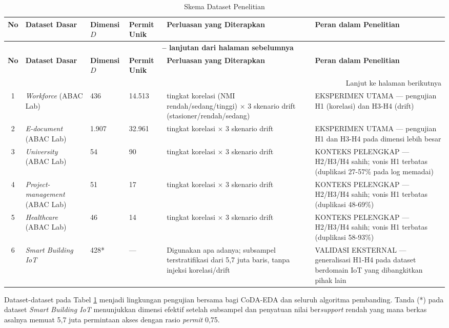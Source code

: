 \begin{longtable}{|c|>{\raggedright\arraybackslash}p{2.2cm}|p{1.5cm}|p{1.5cm}|>{\raggedright\arraybackslash}p{3cm}|>{\raggedright\arraybackslash}p{3cm}|}
\caption{Skema Dataset Penelitian}
\label{tab:skema-dataset} \\
\hline
\textbf{No} & \textbf{Dataset Dasar} & \textbf{Dimensi $D$} & \textbf{Permit Unik} & \textbf{Perluasan yang Diterapkan} & \textbf{Peran dalam Penelitian} \\
\hline
\endfirsthead

\multicolumn{6}{c}{{\bfseries \tablename\ \thetable{} -- lanjutan dari halaman sebelumnya}} \\
\hline
\textbf{No} & \textbf{Dataset Dasar} & \textbf{Dimensi $D$} & \textbf{Permit Unik} & \textbf{Perluasan yang Diterapkan} & \textbf{Peran dalam Penelitian} \\
\hline
\endhead

\hline
\multicolumn{6}{r}{Lanjut ke halaman berikutnya} \\
\endfoot

\hline
\endlastfoot

1 & \textit{Workforce} (ABAC Lab) & 436 & 14.513 & 3 tingkat korelasi (NMI rendah/sedang/tinggi) $\times$ 3 skenario drift (stasioner/rendah/sedang) & EKSPERIMEN UTAMA --- pengujian H1 (korelasi) dan H3-H4 (drift) \\
\hline
2 & \textit{E-document} (ABAC Lab) & 1.907 & 32.961 & 3 tingkat korelasi $\times$ 3 skenario drift & EKSPERIMEN UTAMA --- pengujian H1 dan H3-H4 pada dimensi lebih besar \\
\hline
3 & \textit{University} (ABAC Lab) & 54 & 90 & 3 tingkat korelasi $\times$ 3 skenario drift & KONTEKS PELENGKAP --- H2/H3/H4 sahih; vonis H1 terbatas (duplikasi 27-57\% pada log memadai) \\
\hline
4 & \textit{Project-management} (ABAC Lab) & 51 & 17 & 3 tingkat korelasi $\times$ 3 skenario drift & KONTEKS PELENGKAP --- H2/H3/H4 sahih; vonis H1 terbatas (duplikasi 48-69\%) \\
\hline
5 & \textit{Healthcare} (ABAC Lab) & 46 & 14 & 3 tingkat korelasi $\times$ 3 skenario drift & KONTEKS PELENGKAP --- H2/H3/H4 sahih; vonis H1 terbatas (duplikasi 58-93\%) \\
\hline
6 & \textit{Smart Building IoT} \parencite{diaz-rodriguez_abac_2025} & 428* & --- & Digunakan apa adanya; subsampel terstratifikasi dari 5,7 juta baris, tanpa injeksi korelasi/drift & VALIDASI EKSTERNAL --- generalisasi H1-H4 pada dataset berdomain IoT yang dibangkitkan pihak lain \\
\hline

\end{longtable}

Dataset-dataset pada Tabel \ref{tab:skema-dataset} menjadi lingkungan pengujian bersama bagi CoDA-EDA dan seluruh algoritma pembanding.
Tanda (*) pada dataset \textit{Smart Building IoT} menunjukkan dimensi efektif setelah subsampel dan penyatuan nilai ber\textit{support} rendah yang mana berkas asalnya memuat 5,7 juta permintaan akses dengan rasio \textit{permit} 0,75.